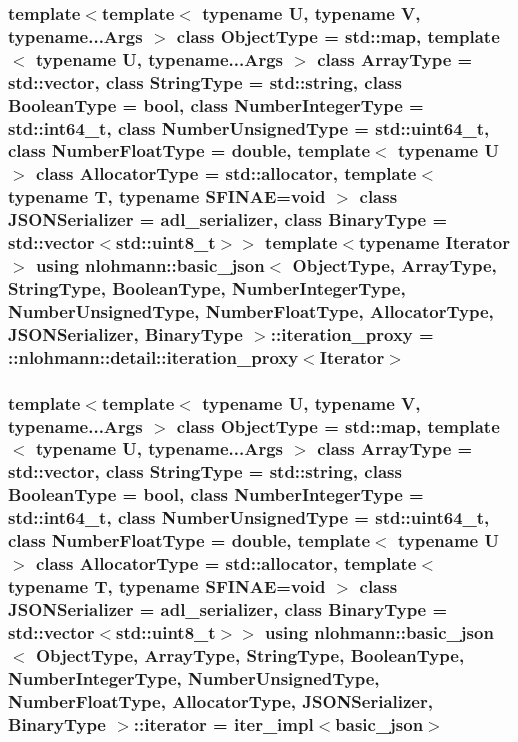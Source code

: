 \subsubsection[{\texorpdfstring{iteration\+\_\+proxy}{iteration_proxy}}]{\setlength{\rightskip}{0pt plus 5cm}template$<$template$<$ typename U, typename V, typename...\+Args $>$ class Object\+Type = std\+::map, template$<$ typename U, typename...\+Args $>$ class Array\+Type = std\+::vector, class String\+Type  = std\+::string, class Boolean\+Type  = bool, class Number\+Integer\+Type  = std\+::int64\+\_\+t, class Number\+Unsigned\+Type  = std\+::uint64\+\_\+t, class Number\+Float\+Type  = double, template$<$ typename U $>$ class Allocator\+Type = std\+::allocator, template$<$ typename T, typename S\+F\+I\+N\+A\+E=void $>$ class J\+S\+O\+N\+Serializer = adl\+\_\+serializer, class Binary\+Type  = std\+::vector$<$std\+::uint8\+\_\+t$>$$>$ template$<$typename Iterator $>$ using {\bf nlohmann\+::basic\+\_\+json}$<$ Object\+Type, Array\+Type, String\+Type, Boolean\+Type, Number\+Integer\+Type, Number\+Unsigned\+Type, Number\+Float\+Type, Allocator\+Type, J\+S\+O\+N\+Serializer, Binary\+Type $>$\+::{\bf iteration\+\_\+proxy} =  \+::{\bf nlohmann\+::detail\+::iteration\+\_\+proxy}$<$Iterator$>$\hspace{0.3cm}{\ttfamily [private]}}\hypertarget{classnlohmann_1_1basic__json_ae2ce7eec3ae7e7b903e0344e89f0512b}{}\label{classnlohmann_1_1basic__json_ae2ce7eec3ae7e7b903e0344e89f0512b}
\subsubsection[{\texorpdfstring{iterator}{iterator}}]{\setlength{\rightskip}{0pt plus 5cm}template$<$template$<$ typename U, typename V, typename...\+Args $>$ class Object\+Type = std\+::map, template$<$ typename U, typename...\+Args $>$ class Array\+Type = std\+::vector, class String\+Type  = std\+::string, class Boolean\+Type  = bool, class Number\+Integer\+Type  = std\+::int64\+\_\+t, class Number\+Unsigned\+Type  = std\+::uint64\+\_\+t, class Number\+Float\+Type  = double, template$<$ typename U $>$ class Allocator\+Type = std\+::allocator, template$<$ typename T, typename S\+F\+I\+N\+A\+E=void $>$ class J\+S\+O\+N\+Serializer = adl\+\_\+serializer, class Binary\+Type  = std\+::vector$<$std\+::uint8\+\_\+t$>$$>$ using {\bf nlohmann\+::basic\+\_\+json}$<$ Object\+Type, Array\+Type, String\+Type, Boolean\+Type, Number\+Integer\+Type, Number\+Unsigned\+Type, Number\+Float\+Type, Allocator\+Type, J\+S\+O\+N\+Serializer, Binary\+Type $>$\+::{\bf iterator} =  {\bf iter\+\_\+impl}$<${\bf basic\+\_\+json}$>$}\hypertarget{classnlohmann_1_1basic__json_aa549b2b382916b3baafb526e5cb410bd}{}\label{classnlohmann_1_1basic__json_aa549b2b382916b3baafb526e5cb410bd}


